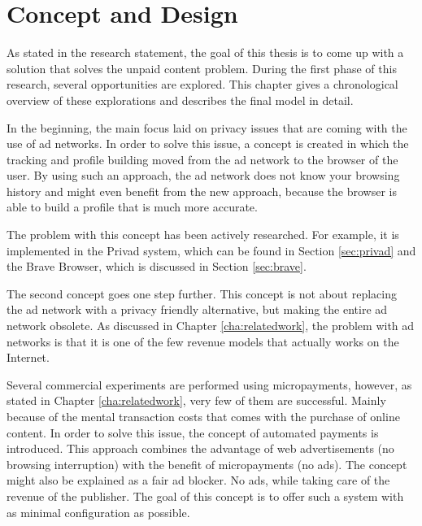 \chapter{Concept and Design}
\label{cha:conceptanddesign}

As stated in the research statement, the goal of this thesis is to come up with a solution that solves the unpaid content problem. During the first phase of this research, several opportunities are explored. This chapter gives a chronological overview of these explorations and describes the final model in detail.

In the beginning, the main focus laid on privacy issues that are coming with the use of ad networks. In order to solve this issue, a concept is created in which the tracking and profile building moved from the ad network to the browser of the user. By using such an approach, the ad network does not know your browsing history and might even benefit from the new approach, because the browser is able to build a profile that is much more accurate. 

The problem with this concept has been actively researched. For example, it is implemented in the Privad system, which can be found in Section \ref{sec:privad} and the Brave Browser, which is discussed in Section \ref{sec:brave}.

\label{sec:uaps}
The second concept goes one step further. This concept is not about replacing the ad network with a privacy friendly alternative, but making the entire ad network obsolete. As discussed in Chapter \ref{cha:relatedwork}, the problem with ad networks is that it is one of the few revenue models that actually works on the Internet.

Several commercial experiments are performed using micropayments, however, as stated in Chapter \ref{cha:relatedwork}, very few of them are successful. Mainly because of the mental transaction costs that comes with the purchase of online content. In order to solve this issue, the concept of automated payments is introduced. This approach combines the advantage of web advertisements (no browsing interruption) with the benefit of micropayments (no ads). The concept might also be explained as a fair ad blocker. No ads, while taking care of the revenue of the publisher. The goal of this concept is to offer such a system with as minimal configuration as possible.

\newpage

